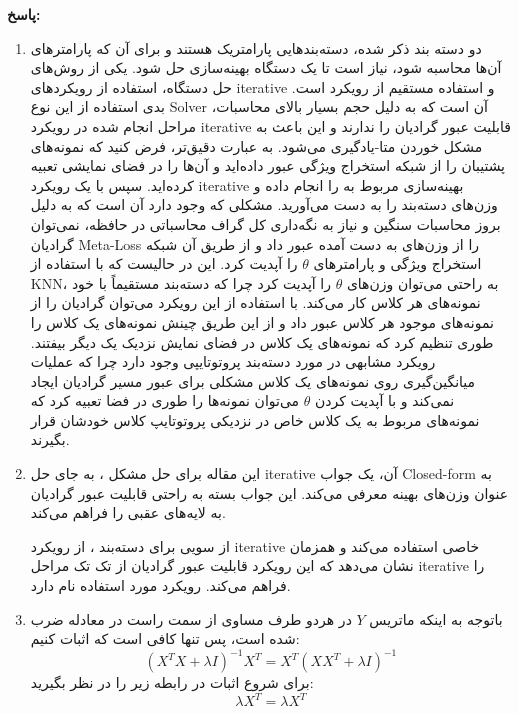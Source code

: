 \documentclass{article}
\begin{document}
\textbf{پاسخ:}

\begin{enumerate}
	\item
دو دسته بند ذکر شده، دسته‌بندهایی پارامتریک هستند و برای آن که پارامترهای آن‌ها محاسبه شود، نیاز است تا یک دستگاه بهینه‌سازی حل شود. یکی از روش‌های حل دستگاه، استفاده از رویکردهای iterative و استفاده مستقیم از رویکرد 
 است. بدی استفاده از این نوع Solver آن است که به دلیل حجم بسیار بالای محاسبات، مراحل انجام شده در رویکرد iterative قابلیت عبور گرادیان را ندارند و این باعث به مشکل خوردن متا-یادگیری می‌شود. به عبارت دقیق‌تر، فرض کنید که نمونه‌های پشتیبان را از شبکه استخراج ویژگی عبور داده‌اید و آن‌ها را در فضای نمایشی تعبیه کرده‌اید. سپس با یک رویکرد iterative بهینه‌سازی مربوط به 
  را انجام داده و وزن‌های دسته‌بند را به دست می‌آورید. مشکلی که وجود دارد آن است که به دلیل بروز محاسبات سنگین و نیاز به نگه‌داری کل گراف محاسباتی در حافظه، نمی‌توان گرادیان Meta-Loss را از وزن‌های به دست آمده عبور داد و از طریق آن شبکه استخراج ویژگی و پارامترهای 
$\theta$
را آپدیت کرد. این در حالیست که با استفاده از KNN، به راحتی می‌توان وزن‌های 
$\theta$
را آپدیت کرد چرا که دسته‌بند مستقیماً با خود نمونه‌های هر کلاس کار می‌کند. با استفاده از این رویکرد می‌توان گرادیان را از نمونه‌های موجود هر کلاس عبور داد و از این طریق چینش نمونه‌های یک کلاس را طوری تنظیم کرد که نمونه‌های یک کلاس در فضای نمایش نزدیک یک دیگر بیفتند. رویکرد مشابهی در مورد دسته‌بند پروتوتایپی وجود دارد چرا که عملیات میانگین‌گیری روی نمونه‌های یک کلاس مشکلی برای عبور مسیر گرادیان ایجاد نمی‌کند و با آپدیت کردن 
$\theta$
می‌توان نمونه‌ها را طوری در فضا تعبیه کرد که نمونه‌های مربوط به یک کلاس خاص در نزدیکی پروتوتایپ کلاس خودشان قرار بگیرند.
	\item
	این مقاله برای حل مشکل
	، به جای حل iterative آن، یک جواب Closed-form به عنوان وزن‌های بهینه معرفی می‌کند. این جواب بسته به راحتی قابلیت عبور گرادیان به لایه‌های عقبی را فراهم می‌کند.
	
	از سویی برای دسته‌بند
	 ، از رویکرد iterative خاصی استفاده می‌کند و همزمان نشان می‌دهد که این رویکرد قابلیت عبور گرادیان از تک تک مراحل iterative را فراهم می‌کند. رویکرد مورد استفاده 
	نام دارد.
	
	\item
	باتوجه به اینکه ماتریس $Y$ در هردو طرف مساوی از سمت راست در معادله ضرب شده است،‌ پس تنها کافی است که اثبات کنیم:
	$$
	{\left( {{X^T}X + \lambda I} \right)^{ - 1}}{X^T} = {X^T}{\left( {X{X^T} + \lambda I} \right)^{ - 1}}
	$$
	برای شروع اثبات در رابطه زیر را در نظر بگیرید:
	$$
	\lambda {X^T} = \lambda {X^T}
	$$
	

\end{enumerate}
\end{document}
